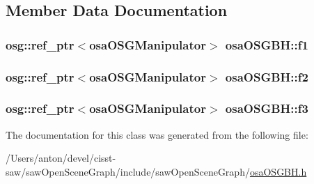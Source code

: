 \subsection{Member Data Documentation}
\hypertarget{classosa_o_s_g_b_h_a836e1fcb735edb2527ab520e5bf0f34f}{}
\subsubsection[{f1}]{\setlength{\rightskip}{0pt plus 5cm}osg\+::ref\+\_\+ptr$<${\bf osa\+O\+S\+G\+Manipulator}$>$ osa\+O\+S\+G\+B\+H\+::f1\hspace{0.3cm}{\ttfamily [protected]}}\label{classosa_o_s_g_b_h_a836e1fcb735edb2527ab520e5bf0f34f}
\hypertarget{classosa_o_s_g_b_h_a46d2249c302d3056e4758fe9ad2fd61c}{}
\subsubsection[{f2}]{\setlength{\rightskip}{0pt plus 5cm}osg\+::ref\+\_\+ptr$<${\bf osa\+O\+S\+G\+Manipulator}$>$ osa\+O\+S\+G\+B\+H\+::f2\hspace{0.3cm}{\ttfamily [protected]}}\label{classosa_o_s_g_b_h_a46d2249c302d3056e4758fe9ad2fd61c}
\hypertarget{classosa_o_s_g_b_h_a3f1f482d0c054f21e42116d809a9c1b4}{}
\subsubsection[{f3}]{\setlength{\rightskip}{0pt plus 5cm}osg\+::ref\+\_\+ptr$<${\bf osa\+O\+S\+G\+Manipulator}$>$ osa\+O\+S\+G\+B\+H\+::f3\hspace{0.3cm}{\ttfamily [protected]}}\label{classosa_o_s_g_b_h_a3f1f482d0c054f21e42116d809a9c1b4}


The documentation for this class was generated from the following file\+:\begin{DoxyCompactItemize}
\item 
/\+Users/anton/devel/cisst-\/saw/saw\+Open\+Scene\+Graph/include/saw\+Open\+Scene\+Graph/\hyperlink{osa_o_s_g_b_h_8h}{osa\+O\+S\+G\+B\+H.\+h}\end{DoxyCompactItemize}
